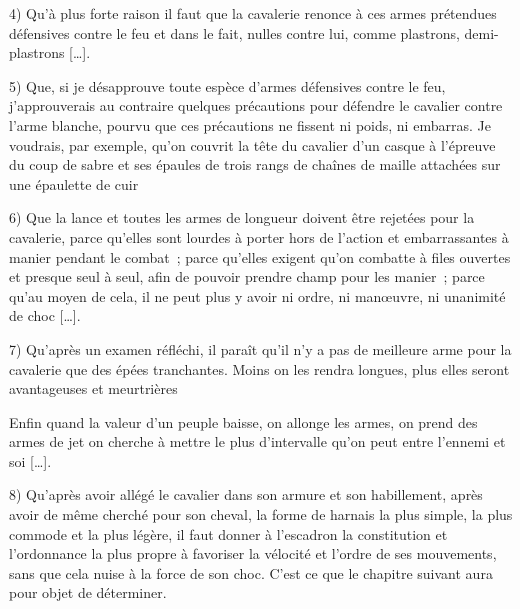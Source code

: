 \documentclass[french,twoside]{book} %
\begin{document}
4) Qu’à plus forte raison il faut que la cavalerie renonce à ces armes prétendues défensives contre le feu et dans le fait, nulles contre lui, comme plastrons, demi-plastrons […].\par
5) Que, si je désapprouve toute espèce d’armes défensives contre le feu, j’approuverais au contraire quelques précautions pour défendre le cavalier contre l’arme blanche, pourvu que ces précautions ne fissent ni poids, ni embarras. Je voudrais, par exemple, qu’on couvrit la tête du cavalier d’un casque à l’épreuve du coup de sabre et ses épaules de trois rangs de chaînes de maille attachées sur une épaulette de cuir\par
6) Que la lance et toutes les armes de longueur doivent être rejetées pour la cavalerie, parce qu’elles sont lourdes à porter hors de l’action et embarrassantes à manier pendant le combat ; parce qu’elles exigent qu’on combatte à files ouvertes et presque seul à seul, afin de pouvoir prendre champ pour les manier ; parce qu’au moyen de cela, il ne peut plus y avoir ni ordre, ni manœuvre, ni unanimité de choc […].\par
7) Qu’après un examen réfléchi, il paraît qu’il n’y a pas de meilleure arme pour la cavalerie que des épées tranchantes. Moins on les rendra longues, plus elles seront avantageuses et meurtrières\par
Enfin quand la valeur d’un peuple baisse, on allonge les armes, on prend des armes de jet on cherche à mettre le plus d’intervalle qu’on peut entre l’ennemi et soi […].\par
8) Qu’après avoir allégé le cavalier dans son armure et son habillement, après avoir de même cherché pour son cheval, la forme de harnais la plus simple, la plus commode et la plus légère, il faut donner à l’escadron la constitution et l’ordonnance la plus propre à favoriser la vélocité et l’ordre de ses mouvements, sans que cela nuise à la force de son choc. C’est ce que le chapitre suivant aura pour objet de déterminer.
\end{document}
